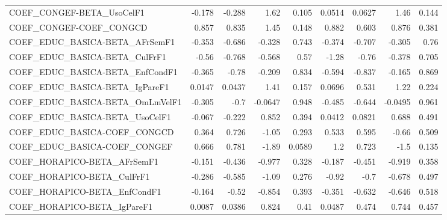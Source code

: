 \begin{tabular}{lrrrrrrrr}
COEF\_CONGEF-BETA\_UsoCelF1             &      -0.178 &       -0.288 &     1.62 &    0.105 &     0.0514 &      0.0627 &         1.46 &         0.144 \\
COEF\_CONGEF-COEF\_CONGCD               &       0.857 &        0.835 &     1.45 &    0.148 &      0.882 &       0.603 &        0.876 &         0.381 \\
COEF\_EDUC\_BASICA-BETA\_AFrSemF1        &      -0.353 &       -0.686 &   -0.328 &    0.743 &     -0.374 &      -0.707 &       -0.305 &          0.76 \\
COEF\_EDUC\_BASICA-BETA\_CulFrF1         &       -0.56 &       -0.768 &   -0.568 &     0.57 &      -1.28 &       -0.76 &       -0.378 &         0.705 \\
COEF\_EDUC\_BASICA-BETA\_EnfCondF1       &      -0.365 &        -0.78 &   -0.209 &    0.834 &     -0.594 &      -0.837 &       -0.165 &         0.869 \\
COEF\_EDUC\_BASICA-BETA\_IgPareF1        &      0.0147 &       0.0437 &     1.41 &    0.157 &     0.0696 &       0.531 &         1.22 &         0.224 \\
COEF\_EDUC\_BASICA-BETA\_OmLmVelF1       &      -0.305 &         -0.7 &  -0.0647 &    0.948 &     -0.485 &      -0.644 &      -0.0495 &         0.961 \\
COEF\_EDUC\_BASICA-BETA\_UsoCelF1        &      -0.067 &       -0.222 &    0.852 &    0.394 &     0.0412 &      0.0821 &        0.688 &         0.491 \\
COEF\_EDUC\_BASICA-COEF\_CONGCD          &       0.364 &        0.726 &    -1.05 &    0.293 &      0.533 &       0.595 &        -0.66 &         0.509 \\
COEF\_EDUC\_BASICA-COEF\_CONGEF          &       0.666 &        0.781 &    -1.89 &   0.0589 &        1.2 &       0.723 &         -1.5 &         0.135 \\
COEF\_HORAPICO-BETA\_AFrSemF1           &      -0.151 &       -0.436 &   -0.977 &    0.328 &     -0.187 &      -0.451 &       -0.919 &         0.358 \\
COEF\_HORAPICO-BETA\_CulFrF1            &      -0.286 &       -0.585 &    -1.09 &    0.276 &      -0.92 &        -0.7 &       -0.678 &         0.497 \\
COEF\_HORAPICO-BETA\_EnfCondF1          &      -0.164 &        -0.52 &   -0.854 &    0.393 &     -0.351 &      -0.632 &       -0.646 &         0.518 \\
COEF\_HORAPICO-BETA\_IgPareF1           &      0.0087 &       0.0386 &    0.824 &     0.41 &     0.0487 &       0.474 &        0.744 &         0.457 \\

\end{tabular}
